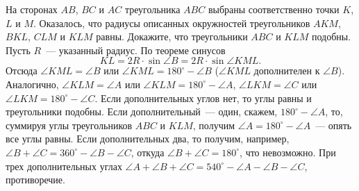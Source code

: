 \problem
На сторонах $AB$, $BC$ и $AC$ треугольника $ABC$ выбраны соответственно точки
$K$, $L$ и $M$.
Оказалось, что радиусы описанных окружностей треугольников
$AKM$, $BKL$, $CLM$ и $KLM$ равны.
Докажите, что треугольники $ABC$ и $KLM$ подобны.
%
\label{solution:2012/regatta/senior/geomt/1}%
Пусть $R$~--- указанный радиус.
По теореме синусов
\[
    KL = 2 R \cdot \sin \angle B = 2 R \cdot \sin \angle KML
.\]
Отсюда $\angle KML = \angle B$ или $\angle KML = 180^\circ - \angle B$
($\angle KML$ дополнителен к $\angle B$).
Аналогично,
$\angle KLM = \angle A$ или $\angle KLM = 180^\circ - \angle A$,
$\angle LKM = \angle C$ или $\angle LKM = 180^\circ - \angle C$.
Если дополнительных углов нет, то углы равны и треугольники подобны.
Если дополнительный~--- один, скажем, $180^\circ - \angle A$, то,
суммируя углы треугольников $ABC$ и $KLM$, получим
$\angle A = 180^\circ - \angle A$~--- опять все углы равны.
Если дополнительных два, то получим, например,
$\angle B + \angle C = 360^\circ - \angle B - \angle C$,
откуда $\angle B + \angle C = 180^\circ$, что невозможно.
При трех дополнительных углах
$\angle A + \angle B + \angle C = 540^\circ - \angle A - \angle B - \angle C$,
противоречие.
\endproblem
